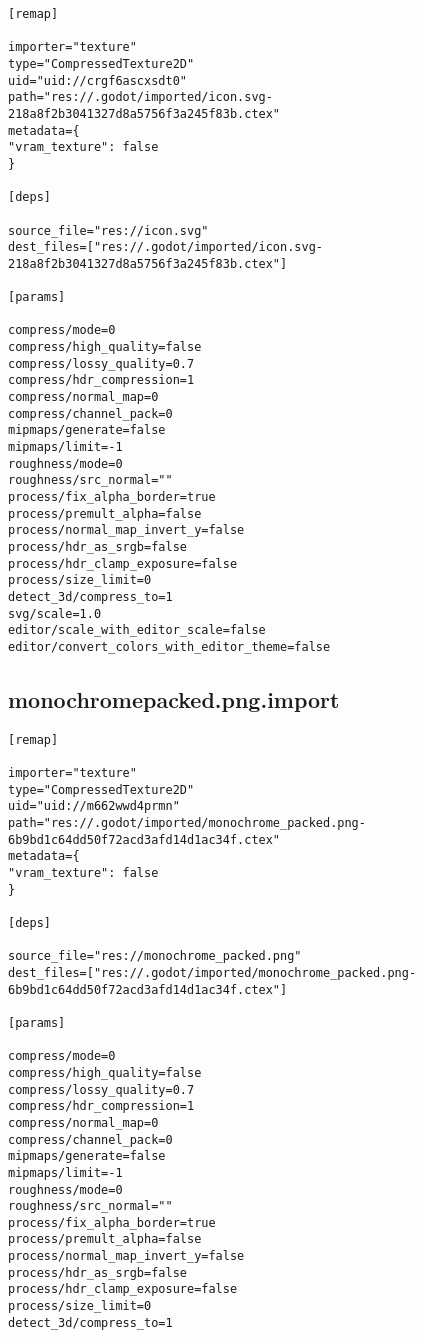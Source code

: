 \begin{lstlisting}
[remap]

importer="texture"
type="CompressedTexture2D"
uid="uid://crgf6ascxsdt0"
path="res://.godot/imported/icon.svg-218a8f2b3041327d8a5756f3a245f83b.ctex"
metadata={
"vram_texture": false
}

[deps]

source_file="res://icon.svg"
dest_files=["res://.godot/imported/icon.svg-218a8f2b3041327d8a5756f3a245f83b.ctex"]

[params]

compress/mode=0
compress/high_quality=false
compress/lossy_quality=0.7
compress/hdr_compression=1
compress/normal_map=0
compress/channel_pack=0
mipmaps/generate=false
mipmaps/limit=-1
roughness/mode=0
roughness/src_normal=""
process/fix_alpha_border=true
process/premult_alpha=false
process/normal_map_invert_y=false
process/hdr_as_srgb=false
process/hdr_clamp_exposure=false
process/size_limit=0
detect_3d/compress_to=1
svg/scale=1.0
editor/scale_with_editor_scale=false
editor/convert_colors_with_editor_theme=false
\end{lstlisting}

\subsection{monochrome\textunderscore{}packed.png.import}

\begin{lstlisting}
[remap]

importer="texture"
type="CompressedTexture2D"
uid="uid://m662wwd4prmn"
path="res://.godot/imported/monochrome_packed.png-6b9bd1c64dd50f72acd3afd14d1ac34f.ctex"
metadata={
"vram_texture": false
}

[deps]

source_file="res://monochrome_packed.png"
dest_files=["res://.godot/imported/monochrome_packed.png-6b9bd1c64dd50f72acd3afd14d1ac34f.ctex"]

[params]

compress/mode=0
compress/high_quality=false
compress/lossy_quality=0.7
compress/hdr_compression=1
compress/normal_map=0
compress/channel_pack=0
mipmaps/generate=false
mipmaps/limit=-1
roughness/mode=0
roughness/src_normal=""
process/fix_alpha_border=true
process/premult_alpha=false
process/normal_map_invert_y=false
process/hdr_as_srgb=false
process/hdr_clamp_exposure=false
process/size_limit=0
detect_3d/compress_to=1
\end{lstlisting}